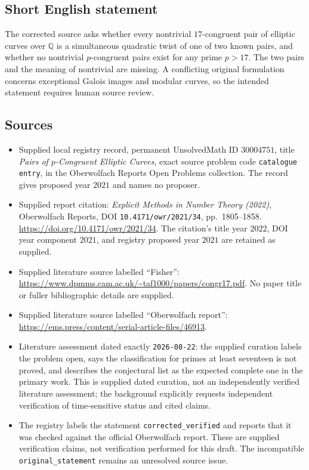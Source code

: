 \documentclass[11pt]{article}
\newcommand{\Q}{\mathbb{Q}}
\begin{document}
\subsection{Short English statement}
The corrected source asks whether every nontrivial \(17\)-congruent pair of elliptic curves over \(\Q\) is a simultaneous quadratic twist of one of two known pairs, and whether no nontrivial \(p\)-congruent pairs exist for any prime \(p>17\). The two pairs and the meaning of nontrivial are missing. A conflicting original formulation concerns exceptional Galois images and modular curves, so the intended statement requires human source review.
\subsection{Sources}
\begin{itemize}
\item Supplied local registry record, permanent UnsolvedMath ID \(30004751\), title \emph{Pairs of \(p\)-Congruent Elliptic Curves}, exact source problem code \texttt{catalogue entry}, in the Oberwolfach Reports Open Problems collection. The record gives proposed year \(2021\) and names no proposer.
\item Supplied report citation: \emph{Explicit Methods in Number Theory (2022)}, Oberwolfach Reports, DOI \texttt{10.4171/owr/2021/34}, pp.~1805--1858. \url{https://doi.org/10.4171/owr/2021/34}. The citation's title year \(2022\), DOI year component \(2021\), and registry proposed year \(2021\) are retained as supplied.
\item Supplied literature source labelled ``Fisher'': \url{https://www.dpmms.cam.ac.uk/~taf1000/papers/congr17.pdf}. No paper title or fuller bibliographic details are supplied.
\item Supplied literature source labelled ``Oberwolfach report'': \url{https://ems.press/content/serial-article-files/46913}.
\item Literature assessment dated exactly \texttt{2026-08-22}: the supplied curation labels the problem open, says the classification for primes at least seventeen is not proved, and describes the conjectural list as the expected complete one in the primary work. This is supplied dated curation, not an independently verified literature assessment; the background explicitly requests independent verification of time-sensitive status and cited claims.
\item The registry labels the statement \texttt{corrected\_verified} and reports that it was checked against the official Oberwolfach report. These are supplied verification claims, not verification performed for this draft. The incompatible \texttt{original\_statement} remains an unresolved source issue.
\end{itemize}
\end{document}
